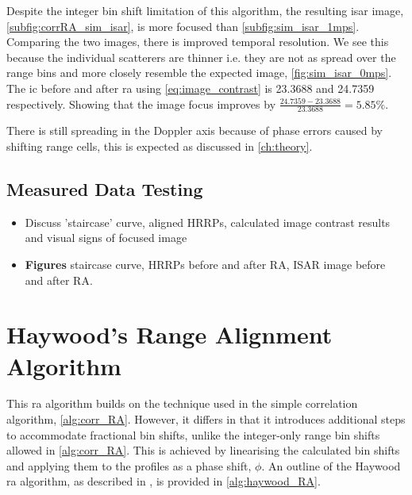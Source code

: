 \documentclass[class=report,11pt,crop=false]{standalone}
\begin{document}
    Despite the integer bin shift limitation of this algorithm, the resulting \gls{isar} image, \autoref{subfig:corrRA_sim_isar}, is more focused than \autoref{subfig:sim_isar_1mps}. Comparing the two images, there is improved temporal resolution. We see this because the individual scatterers are thinner i.e. they are not as spread over the range bins and more closely resemble the expected image, \autoref{fig:sim_isar_0mps}. The \gls{ic} before and after \gls{ra} using \autoref{eq:image_contrast} is 23.3688 and 24.7359 respectively. Showing that the image focus improves by \( \frac{24.7359 - 23.3688}{23.3688} = 5.85\% \).

There is still spreading in the Doppler axis because of phase errors caused by shifting range cells, this is expected as discussed in \autoref{ch:theory}.
    \subsection{Measured Data Testing}
    \begin{itemize}
        \item Discuss 'staircase' curve, aligned HRRPs, calculated image contrast results and visual signs of focused image
        \item \textbf{Figures} staircase curve, HRRPs before and after RA, ISAR image before and after RA.
    \end{itemize}

\section{Haywood's Range Alignment Algorithm}
This \gls{ra} algorithm builds on the technique used in the simple correlation algorithm, \autoref{alg:corr_RA}. However, it differs in that it introduces additional steps to accommodate fractional bin shifts, unlike the integer-only range bin shifts allowed in \autoref{alg:corr_RA}. This is achieved by linearising the calculated bin shifts and applying them to the profiles as a phase shift, $\phi$. An outline of the Haywood \gls{ra} algorithm, as described in \cite{haywood_RA_AF,zyweck}, is provided in \autoref{alg:haywood_RA}.
\end{document}
